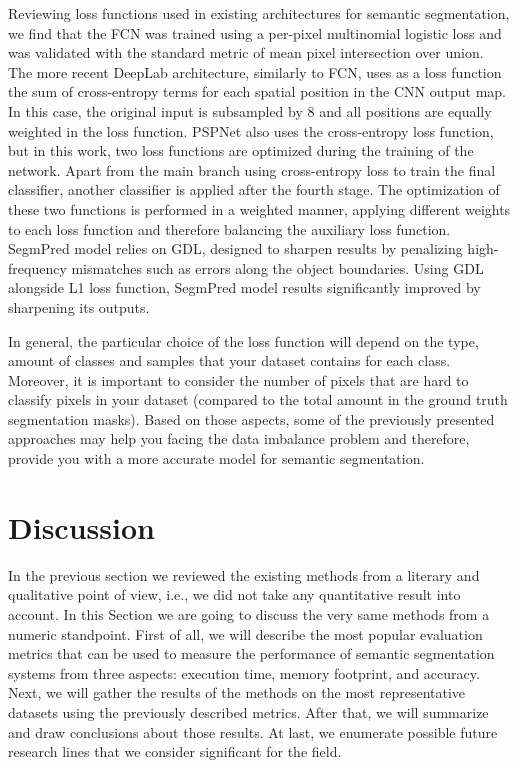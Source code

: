 Reviewing loss functions used in existing architectures for semantic segmentation, we find that the FCN \cite{Long2015} was trained using a per-pixel multinomial logistic loss and was validated with the standard metric of mean pixel intersection over union. The more recent DeepLab \cite{Chen2016} architecture, similarly to FCN, uses as a loss function the sum of cross-entropy terms for each spatial position in the CNN output map. In this case, the original input is subsampled by $8$ and all positions are equally weighted in the loss function. PSPNet \cite{Zhao2016} also uses the cross-entropy loss function, but in this work, two loss functions are optimized during the training of the network. Apart from the main branch using cross-entropy loss to train the final classifier, another classifier is applied after the fourth stage. The optimization of these two functions is performed in a weighted manner, applying different weights to each loss function and therefore balancing the auxiliary loss function. SegmPred \cite{Luc2017} model relies on \ac{GDL},  designed to sharpen results by penalizing high-frequency mismatches such as errors along the object boundaries. Using \ac{GDL} alongside L1 loss function, SegmPred model results significantly improved by sharpening its outputs. 

In general, the particular choice of the loss function will depend on the type, amount of classes and samples that your dataset contains for each class. Moreover, it is important to consider the number of pixels that are hard to classify pixels in your dataset (compared to the total amount in the ground truth segmentation masks). Based on those aspects, some of the previously presented approaches may help you facing the data imbalance problem and therefore, provide you with a more accurate model for semantic segmentation.

\section{Discussion}
\label{sec:discussion}

In the previous section we reviewed the existing methods from a literary and qualitative point of view, i.e., we did not take any quantitative result into account. In this Section we are going to discuss the very same methods from a numeric standpoint. First of all, we will describe the most popular evaluation metrics that can be used to measure the performance of semantic segmentation systems from three aspects: execution time, memory footprint, and accuracy. Next, we will gather the results of the methods on the most representative datasets using the previously described metrics. After that, we will summarize and draw conclusions about those results. At last, we enumerate possible future research lines that we consider significant for the field.


